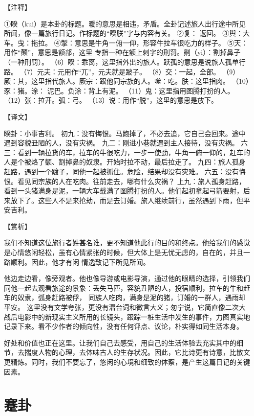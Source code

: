 \documentclass[12pt,UTF8]{ctexbook}
\begin{document}
【注释】

①睽（kui）是本卦的标题。暖的意思是相违，矛盾。全卦记述旅人出行途中所见所闻，像一篇旅行日记。作标题的“睽朕”字与内容有关。
②复： 返回。
③舆：大车。曳：拖拉。
④掣：意思是牛角一俯一仰，形容牛拉车很吃力的样子。
⑤天：用作“颠”，意思是额部，这里 专指一种在额上刺字的刑罚。劓（yi）：割掉鼻子（一种刑罚）。
（6）睽：乖离，这里指外出的旅人。跃孤的意思是说旅人孤单行路。
（7）元夫：元用作“兀”，元夫就是跛子。
（8）交：一起，全部。
（9）厥：其，这里指代旅人。厥宗：跟他同宗族的人。噬：吃。肤：这里指肉。
（10）豕：猪。涂： 泥巴。负涂：背上有泥。
（11）鬼：这里指用图腾打扮的人。
（12）张：拉开。弧：弓。
（13）说：用作“脱”，这里的意思是放下。

【译文】

睽卦：小事吉利。
初九：没有悔恨。马跑掉了，不必去追，它自己会回来。途中遇到容貌丑陋的人，没有灾祸。
九二：刚进小巷就遇到主人接待，没有灾祸。
六三：看到一辆拉货的车，拉车的牛很吃力，一步一使劲，牛角一俯一仰的，赶车的人是个被烙了额、割掉鼻的奴隶。开始时拉不动，最后拉走了。
九四：旅人孤身赶路，遇到一个踱子，同他一起被抓住。危险，结果却没有灾难。
六五：没有悔恨。看见同宗族的人在吃肉。往前走去，哪有什么灾祸？
上九：旅人孤身赶路，看到一头猪满身是泥，一辆大车载满了图腾打扮的人。他们起初拿起弓箭要射，后来放下了。这些人不是来抢劫，而是去订婚。旅人继续前行，虽然遇到下雨，但平安吉利。

【赏析】

我们不知道这位旅行者姓甚名谁，更不知道他此行的目的和终点。他给我们的感觉是心情悠闲轻松，虽有心情紧张的时候，但大体上是无忧无虑的，自在的，并且一路顺利。因此，他才有闲 情逸致记下所见所闻。

他边走边看，像旁观者。他也像导游或电影导演，通过他的眼睛的选择，引领我们同他一起去观看旅途的景象：丢失马匹，容貌丑陋的人，投宿顺利，拉车的牛和赶车的奴隶，弧身赶路被俘， 同族人吃肉，满身是泥的猪，订婚的一群人，遇雨却平安。 这里没有文学夸张，更没有潜台词和微言大义；匆宁说，它简直像二次大战后电影中的新现实主义所用的长镜头，跟踪一桩生活中发生的事件，力图真实地记录下来。看不少作者的倾向性，没有任何评点、议论，朴实得如同生活本身。

好处和价值也正在这里。让我们自己去感受，用自己的生活体验去充实其中的细节，去揣度人物的心理，去体味古人的生存状况。因此，它比诗更有诗意，比散文更精炼。同时，我们不要忘了，悠闲的心境和细致的体察，是产生这篇日记的关键因素。

\chapter{蹇卦}
\end{document}
